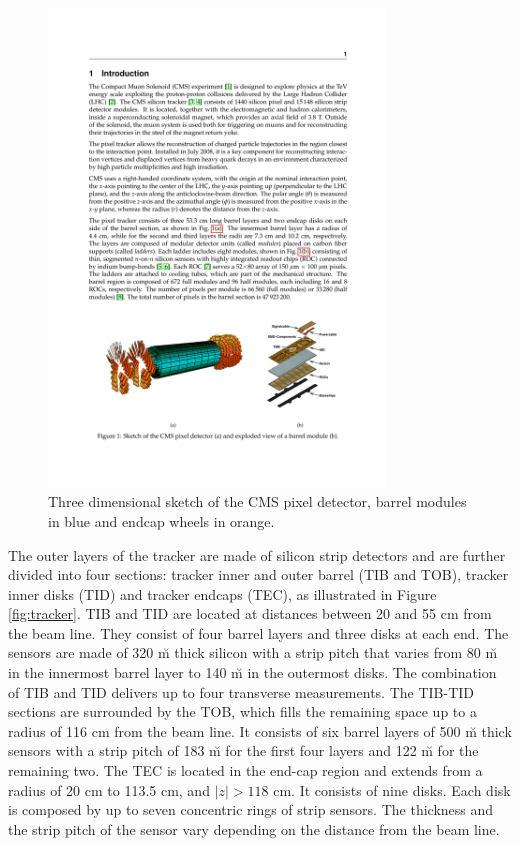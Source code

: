 \begin{figure}
\begin{center}
\includegraphics[angle=-0,width=0.8\textwidth]{2_LHC_and_CMS/pics/pixelfull.pdf}
\caption{Three dimensional sketch of the CMS pixel detector, barrel modules in blue and endcap wheels in orange.
\label{fig:pixel}
}
\end{center}
\end{figure}

The outer layers of the tracker are made of silicon strip detectors and are further divided into four sections: tracker inner and outer barrel (TIB and TOB), tracker inner disks (TID) and tracker endcaps (TEC), as illustrated in Figure \ref{fig:tracker}. TIB and TID are located at distances between 20 and 55 cm from the beam line. They consist of four barrel layers and three disks at each end. The sensors are made of 320 \u m thick silicon with a strip pitch that varies from 80 \u m in the innermost barrel layer to 140 \u m in the outermost disks. The combination of TIB and TID delivers up to four transverse measurements. The TIB-TID sections are surrounded by the TOB, which fills the remaining space up to a radius of 116 cm from the beam line. It consists of six barrel layers of 500 \u m thick sensors with a strip pitch of 183 \u m for the first four layers and 122 \u m for the remaining two. The TEC is located in the end-cap region and extends from a radius of 20 cm to 113.5 cm, and $|z| > 118$ cm. It consists of nine disks. Each disk is composed by up to seven concentric rings of strip sensors. The thickness and the strip pitch of the sensor vary depending on the distance from the beam line. 

